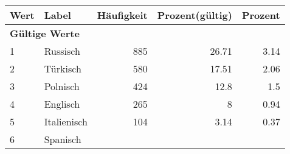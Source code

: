      \begin{longtable}{lXrrr}
     \toprule
     \textbf{Wert} & \textbf{Label} & \textbf{Häufigkeit} & \textbf{Prozent(gültig)} & \textbf{Prozent} \\
     \endhead
     \midrule
     \multicolumn{5}{l}{\textbf{Gültige Werte}}\\

     1 &
     \multicolumn{1}{X}{ Russisch   } &


       \num{885} &
       \num[round-mode=places,round-precision=2]{26.71} &
         \num[round-mode=places,round-precision=2]{3.14} \\

     2 &
     \multicolumn{1}{X}{ Türkisch   } &


       \num{580} &
       \num[round-mode=places,round-precision=2]{17.51} &
         \num[round-mode=places,round-precision=2]{2.06} \\

     3 &
     \multicolumn{1}{X}{ Polnisch   } &


       \num{424} &
       \num[round-mode=places,round-precision=2]{12.8} &
         \num[round-mode=places,round-precision=2]{1.5} \\

     4 &
     \multicolumn{1}{X}{ Englisch   } &


       \num{265} &
       \num[round-mode=places,round-precision=2]{8} &
         \num[round-mode=places,round-precision=2]{0.94} \\

     5 &
     \multicolumn{1}{X}{ Italienisch   } &


       \num{104} &
       \num[round-mode=places,round-precision=2]{3.14} &
         \num[round-mode=places,round-precision=2]{0.37} \\

     6 &
     \multicolumn{1}{X}{ Spanisch   } &



\end{longtable}
